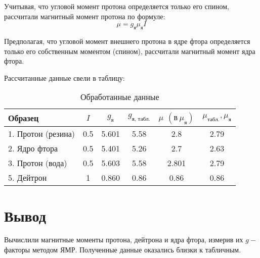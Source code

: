 \documentclass{physlab}
\begin{document}
Учитывая, что угловой момент протона определяется только его спином, рассчитали магнитный момент протона по формуле:
\begin{equation}
    \mu = g_\text{я} \mu_\text{я}I
\end{equation}
 
Предполагая, что  угловой момент внешнего протона в ядре фтора определяется только его собственным моментом (спином), рассчитали магнитный момент ядра фтора. 
 
Рассчитанные данные свели в таблицу:

\begin{table} [h]
	\centering
	\caption{Обработанные данные} 
\begin{tabular}{|l||c|c|c|c|c|}
	\hline
Образец & $I$ & $g_\text{я}$ & $g_\text{я, табл.}$ & $\mu$ $(\text{в} ~\mu_\text{я})$ & $ \mu_\text{табл.}, \mu_\text{я} $ \\
\hline
1. Протон (резина)  & 0.5 & 5.601 & 5.58 & 2.8 & 2.79  \\
\hline
2. Ядро фтора   & 0.5 & 5.401 & 5.26 & 2.7 & 2.63  \\
\hline
3. Протон (вода)& 0.5 & 5.603 & 5.58 & 2.801 & 2.79  \\
\hline
5. Дейтрон  & 1 & 0.860 & 0.86 & 0.86 & 0.86  \\ 
\hline
\end{tabular}
\end{table}
		
\section{Вывод}
Вычислили магнитные моменты протона, дейтрона и ядра фтора, измерив их $g-$факторы методом ЯМР. Полученные данные оказались близки к табличным.
\end{document}
